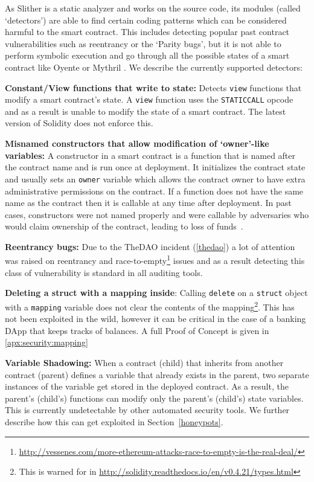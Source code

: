 As Slither is a static analyzer and works on the source code, its modules (called `detectors') are able to find certain coding patterns which can be considered harmful to the smart contract. This includes detecting popular past contract vulnerabilities such as reentrancy or the `Parity bugs', but it is not able to perform symbolic execution and go through all the possible states of a smart contract like Oyente \cite{Luu:2016:MSC:2976749.2978309} or Mythril \cite{mythril}. We describe the currently supported detectors:

\textbf{Constant/View functions that write to state:} Detects \texttt{view} functions that modify a smart contract's state. A \texttt{view} %
function uses the \texttt{STATICCALL} opcode \cite{staticcall} and as a result is unable to modify the state of a smart contract. The latest version of Solidity does not enforce this.

\textbf{Misnamed constructors that allow modification of `owner'-like variables:} A constructor in a smart contract is a function that is named after the contract name and is run once at deployment. It initializes the contract state and usually sets an \texttt{owner} variable which allows the contract owner to have extra administrative permissions on the contract. If a function does not have the same name as the contract then it is callable at any time after deployment. In past cases, constructors were not named properly and were callable by adversaries who would claim ownership of the contract, leading to loss of funds~\cite{Atzei:2017:SAE:3080353.3080363}.

\textbf{Reentrancy bugs:} Due to the TheDAO incident (\ref{thedao}) a lot of attention was raised on reentrancy and race-to-empty\footnote{\url{http://vessenes.com/more-ethereum-attacks-race-to-empty-is-the-real-deal/}} issues and as a result detecting this class of vulnerability is standard in all auditing tools.

\textbf{Deleting a struct with a mapping inside}: Calling \texttt{delete} on a \texttt{struct} object with a \texttt{mapping} variable does not clear the contents of the mapping\footnote{This is warned for in \url{http://solidity.readthedocs.io/en/v0.4.21/types.html}}. This has not been exploited in the wild, however it can be critical in the case of a banking DApp that keeps tracks of balances. A full Proof of Concept is given in \ref{apx:security:mapping}

\textbf{Variable Shadowing:} When a contract (child) that inherits from another contract (parent) defines a variable that already exists in the parent, two separate instances of the variable get stored in the deployed contract. As a result, the parent's (child's) functions can modify only the parent's (child's) state variables. This is currently undetectable by other automated security tools. We further describe how this can get exploited in Section~\ref{honeypots}.

